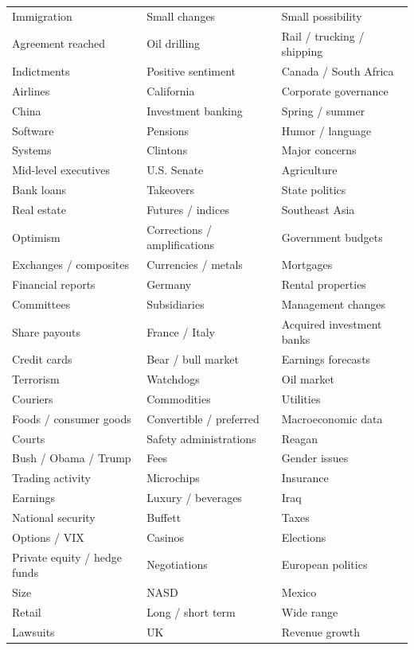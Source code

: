 \documentclass[11pt]{article}
\begin{document}
\begin{longtable}{>{\raggedright\arraybackslash}p{}
                  >{\raggedright\arraybackslash}p{}
                  >{\raggedright\arraybackslash}p{}}
Immigration & Small changes & Small possibility \\
Agreement reached & Oil drilling & Rail / trucking / shipping \\
Indictments & Positive sentiment & Canada / South Africa \\
Airlines & California & Corporate governance \\
China & Investment banking & Spring / summer \\
Software & Pensions & Humor / language \\
Systems & Clintons & Major concerns \\
Mid-level executives & U.S. Senate & Agriculture \\
Bank loans & Takeovers & State politics \\
Real estate & Futures / indices & Southeast Asia \\
Optimism & Corrections / amplifications & Government budgets \\
Exchanges / composites & Currencies / metals & Mortgages \\
Financial reports & Germany & Rental properties \\
Committees & Subsidiaries & Management changes \\
Share payouts & France / Italy & Acquired investment banks \\
Credit cards & Bear / bull market & Earnings forecasts \\
Terrorism & Watchdogs & Oil market \\
Couriers & Commodities & Utilities \\
Foods / consumer goods & Convertible / preferred & Macroeconomic data \\
Courts & Safety administrations & Reagan \\
Bush / Obama / Trump & Fees & Gender issues \\
Trading activity & Microchips & Insurance \\
Earnings & Luxury / beverages & Iraq \\
National security & Buffett & Taxes \\
Options / VIX & Casinos & Elections \\
Private equity / hedge funds & Negotiations & European politics \\
Size & NASD & Mexico \\
Retail & Long / short term & Wide range \\
Lawsuits & UK & Revenue growth \\
\end{longtable}
\end{document}
